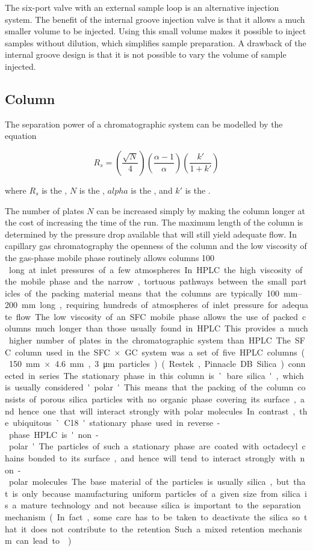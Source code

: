 The six-port valve with an external sample loop is an alternative injection
system. The benefit of the internal groove injection valve is that it allows a
much smaller volume to be injected. Using this small volume makes it possible to
inject samples without dilution, which simplifies sample preparation. A drawback
of the internal groove design is that it is not possible to vary the volume of
sample injected.


\subsection{Column}

The separation power of a chromatographic system can be modelled by the equation 

\[
 R_s = \left(\frac{\sqrt{N}}{4}\right)  \left(\frac{\alpha-1}{\alpha}\right)  \left(\frac{k'}{1+k'}\right)
\]

where \(R_s\) is the , \(N\) is the , \(alpha\) is the , and \(k'\) is the
.
 
The number of plates \(N\) can be increased simply by making the column longer
at the cost of increasing the time of the run. The maximum length of the column
is determined by the pressure drop available that will still yield adequate
flow. In capillary gas chromatography the openness of the column and the low
viscosity of the gas-phase mobile phase routinely allows columns \SI{100}{\metre
} long at inlet pressures of a few atmospheres. In HPLC the high viscosity of
the mobile phase and the narrow, tortuous pathways between the small particles
of the packing material means that the columns are typically
\SIrange{100}{200}{\milli\metre} long, requiring hundreds of atmospheres of
inlet pressure for adequate flow.

The low viscosity of an SFC mobile phase allows the use of packed columns much
longer than those usually found in HPLC. This provides a much higher number of
plates in the chromatographic system than HPLC. The SFC column used in the
SFC×GC system was a set of five HPLC columns (\SI{150}{\milli\metre} ×
\SI{4.6}{\milli\metre}, \SI{3}{\micro\metre} particles) (Restek, Pinnacle DB
Silica) connected in series.

The stationary phase in this column is `bare silica', which is usually
considered 'polar'. This means that the packing of the column consists of porous
silica particles with no organic phase covering its surface, and hence one that
will interact strongly with polar molecules. In contrast, the ubiquitous `C18'
stationary phase used in reverse-phase HPLC is 'non-polar'. The particles of
such a stationary phase are coated with octadecyl chains bonded to its surface,
and hence will tend to interact strongly with non-polar molecules. The base
material of the particles is usually silica, but that is only because
manufacturing uniform particles of a given size from silica is a mature
technology and not because silica is important to the separation mechanism. (In
fact, some care has to be taken to deactivate the silica so that it does not
contribute to the retention. Such a mixed retention mechanism can lead to
.)

